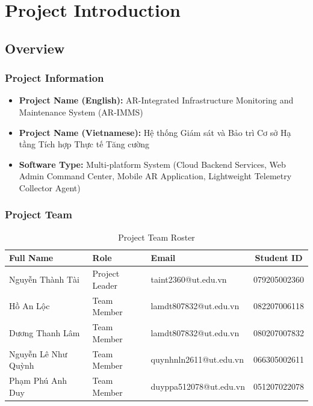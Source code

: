 \chapter{Project Introduction}

\section{Overview}

\subsection{Project Information}
\begin{itemize}
    \item \textbf{Project Name (English):} AR-Integrated Infrastructure Monitoring and Maintenance System (AR-IMMS)
    \item \textbf{Project Name (Vietnamese):} Hệ thống Giám sát và Bảo trì Cơ sở Hạ tầng Tích hợp Thực tế Tăng cường
    \item \textbf{Software Type:} Multi-platform System (Cloud Backend Services, Web Admin Command Center, Mobile AR Application, Lightweight Telemetry Collector Agent)
\end{itemize}

\subsection{Project Team}
\begin{table}[H]
    \centering
    \caption{Project Team Roster}
    \begin{tabular}{|l|l|l|c|}
        \hline
        \textbf{Full Name} & \textbf{Role} & \textbf{Email} & \textbf{Student ID} \\ \hline
        Nguyễn Thành Tài & Project Leader & taint2360@ut.edu.vn & 079205002360 \\ \hline
        Hồ An Lộc & Team Member & lamdt807832@ut.edu.vn & 082207006118 \\ \hline
        Dương Thanh Lâm & Team Member & lamdt807832@ut.edu.vn & 080207007832 \\ \hline
        Nguyễn Lê Như Quỳnh & Team Member & quynhnln2611@ut.edu.vn & 066305002611 \\ \hline
        Phạm Phú Anh Duy & Team Member & duyppa512078@ut.edu.vn & 051207022078 \\ \hline
    \end{tabular}
\end{table}

